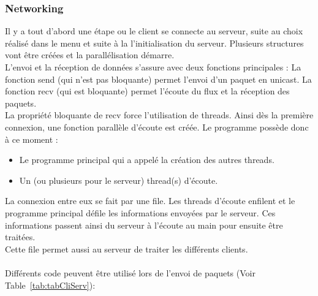 \documentclass[11pt]{article}
\begin{document}
            \subsubsection{Networking}
            Il y a tout d’abord une étape ou le client se connecte au serveur, suite au choix réalisé dans le menu et suite à la l’initialisation du serveur. 
            Plusieurs structures vont être créées et la parallélisation démarre.
            \\
            L’envoi et la réception de données s’assure avec deux fonctions principales :
            La fonction send (qui n’est pas bloquante) permet l’envoi d’un paquet en unicast.
            La fonction recv (qui est bloquante) permet l’écoute du flux et la réception des paquets.
            \\
            La propriété bloquante de recv force l’utilisation de threads.
            Ainsi dès la première connexion, une fonction parallèle d’écoute est créée.
            Le programme possède donc à ce moment :
            \begin{itemize}
                \item Le programme principal qui a appelé la création des autres threads.
                \item Un (ou plusieurs pour le serveur) thread(s) d’écoute. 
            \end{itemize}
            La connexion entre eux se fait par une file. Les threads d’écoute enfilent et le programme principal défile les informations envoyées par le serveur. 
            Ces informations passent ainsi du serveur à l’écoute au main pour ensuite être traitées. \\
            Cette file permet aussi au serveur de traiter les différents clients.\\\\
            Différents code peuvent être utilisé lors de l’envoi de paquets (Voir Table~\ref{tab:tabCliServ}): 
    
\end{document}
